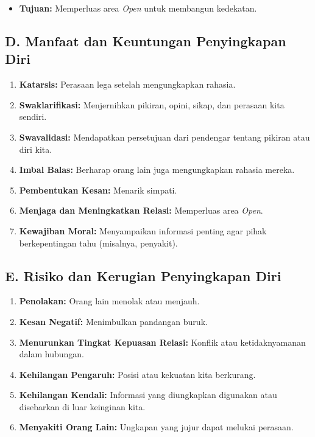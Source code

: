 \documentclass[
  letterpaper,
  DIV=11,
  numbers=noendperiod]{scrreprt}
\providecommand{\tightlist}{%
  \setlength{\itemsep}{0pt}\setlength{\parskip}{0pt}}
\begin{document}
\begin{itemize}
\tightlist
\item
  \textbf{Tujuan:} Memperluas area \emph{Open} untuk membangun
  kedekatan.
\end{itemize}

\subsection{D. Manfaat dan Keuntungan Penyingkapan
Diri}\label{d.-manfaat-dan-keuntungan-penyingkapan-diri}

\begin{enumerate}
\def\labelenumi{\arabic{enumi}.}
\tightlist
\item
  \textbf{Katarsis:} Perasaan lega setelah mengungkapkan rahasia.
\item
  \textbf{Swaklarifikasi:} Menjernihkan pikiran, opini, sikap, dan
  perasaan kita sendiri.
\item
  \textbf{Swavalidasi:} Mendapatkan persetujuan dari pendengar tentang
  pikiran atau diri kita.
\item
  \textbf{Imbal Balas:} Berharap orang lain juga mengungkapkan rahasia
  mereka.
\item
  \textbf{Pembentukan Kesan:} Menarik simpati.
\item
  \textbf{Menjaga dan Meningkatkan Relasi:} Memperluas area \emph{Open}.
\item
  \textbf{Kewajiban Moral:} Menyampaikan informasi penting agar pihak
  berkepentingan tahu (misalnya, penyakit).
\end{enumerate}

\subsection{E. Risiko dan Kerugian Penyingkapan
Diri}\label{e.-risiko-dan-kerugian-penyingkapan-diri}

\begin{enumerate}
\def\labelenumi{\arabic{enumi}.}
\tightlist
\item
  \textbf{Penolakan:} Orang lain menolak atau menjauh.
\item
  \textbf{Kesan Negatif:} Menimbulkan pandangan buruk.
\item
  \textbf{Menurunkan Tingkat Kepuasan Relasi:} Konflik atau
  ketidaknyamanan dalam hubungan.
\item
  \textbf{Kehilangan Pengaruh:} Posisi atau kekuatan kita berkurang.
\item
  \textbf{Kehilangan Kendali:} Informasi yang diungkapkan digunakan atau
  disebarkan di luar keinginan kita.
\item
  \textbf{Menyakiti Orang Lain:} Ungkapan yang jujur dapat melukai
  perasaan.
\end{enumerate}
\end{document}
